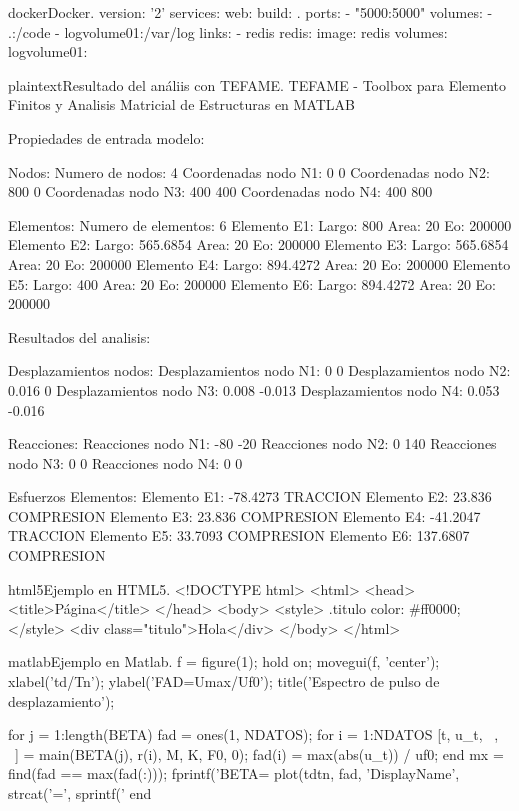 \begin{sourcecode}{docker}{Docker.}
version: '2'
services:
web:
build: .
ports:
- "5000:5000"
volumes:
- .:/code
- logvolume01:/var/log
links:
- redis
redis:
image: redis
volumes:
logvolume01: {}
\end{sourcecode}

\begin{sourcecode}{plaintext}{Resultado del análiis con TEFAME.}
TEFAME - Toolbox para Elemento Finitos y Analisis
Matricial de Estructuras en MATLAB

Propiedades de entrada modelo:

Nodos: 
Numero de nodos: 4 
Coordenadas nodo N1: 0 0
Coordenadas nodo N2: 800 0
Coordenadas nodo N3: 400 400
Coordenadas nodo N4: 400 800

Elementos: 
Numero de elementos: 6 
Elemento E1:	Largo: 800         Area: 20        Eo: 200000    
Elemento E2:	Largo: 565.6854    Area: 20        Eo: 200000    
Elemento E3:	Largo: 565.6854    Area: 20        Eo: 200000    
Elemento E4:	Largo: 894.4272    Area: 20        Eo: 200000    
Elemento E5:	Largo: 400         Area: 20        Eo: 200000    
Elemento E6:	Largo: 894.4272    Area: 20        Eo: 200000    

Resultados del analisis:

Desplazamientos nodos: 
Desplazamientos nodo N1: 0 0
Desplazamientos nodo N2: 0.016 0
Desplazamientos nodo N3: 0.008 -0.013
Desplazamientos nodo N4: 0.053 -0.016

Reacciones: 
Reacciones nodo N1: -80 -20
Reacciones nodo N2: 0 140
Reacciones nodo N3: 0 0
Reacciones nodo N4: 0 0

Esfuerzos Elementos: 
Elemento E1: -78.4273       TRACCION
Elemento E2: 23.836         COMPRESION
Elemento E3: 23.836         COMPRESION
Elemento E4: -41.2047       TRACCION
Elemento E5: 33.7093        COMPRESION
Elemento E6: 137.6807       COMPRESION
\end{sourcecode}

\begin{sourcecode}[\label{codigo-html5}]{html5}{Ejemplo en HTML5.}
<!DOCTYPE html>
<html>
<head>
	<title>Página</title>
</head>
<body>
	<style>
		.titulo {
			color: #ff0000;
		}
	</style>
	<div class="titulo">Hola</div>
</body>
</html>
\end{sourcecode}

\begin{sourcecode}[\label{codigo-matlab}]{matlab}{Ejemplo en Matlab.}
f = figure(1);
hold on;
movegui(f, 'center');
xlabel('td/Tn'); ylabel('FAD=Umax/Uf0');
title('Espectro de pulso de desplazamiento');

for j = 1:length(BETA)
	fad = ones(1, NDATOS); %
	for i = 1:NDATOS
		[t, u_t, ~, ~] = main(BETA(j), r(i), M, K, F0, 0);
		fad(i) = max(abs(u_t)) / uf0;
	end
mx = find(fad == max(fad(:)));
fprintf('BETA=%
plot(tdtn, fad, 'DisplayName', strcat('\beta=', sprintf('%
end	
\end{sourcecode}

